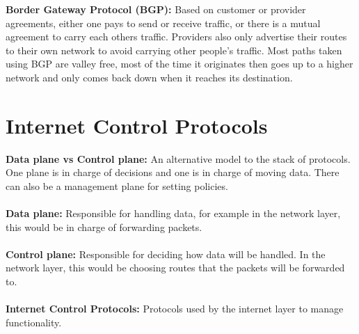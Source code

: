 \documentclass[a4paper,10pt]{article}
\begin{document}
\textcolor{Melon}{\textbf{Border Gateway Protocol (BGP):}} Based on customer or provider agreements, either one pays to send or receive traffic, or there is a mutual agreement to carry each others traffic. Providers also only advertise their routes to their own network to avoid carrying other people's traffic. Most paths taken using BGP are valley free, most of the time it originates then goes up to a higher network and only comes back down when it reaches its destination.
\newpage
\section{Internet Control Protocols}
\textcolor{RubineRed}{\textbf{Data plane vs Control plane:}} An alternative model to the stack of protocols. One plane is in charge of decisions and one is in charge of moving data. There can also be a management plane for setting policies. \\\\
\textcolor{RubineRed}{\textbf{Data plane:}} Responsible for handling data, for example in the network layer, this would be in charge of forwarding packets. \\\\
\textcolor{RubineRed}{\textbf{Control plane:}} Responsible for deciding how data will be handled. In the network layer, this would be choosing routes that the packets will be forwarded to. \\\\
\textcolor{RubineRed}{\textbf{Internet Control Protocols:}} Protocols used by the internet layer to manage functionality. 
\end{document}
